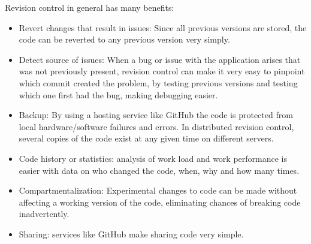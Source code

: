 Revision control in general has many benefits:
\begin{itemize}
  \item Revert changes that result in issues: Since all previous versions are stored, the code can be reverted to any previous version
  very simply.
  \item Detect source of issues: When a bug or issue with the application arises that was not previously present, revision control can
  make it very easy to pinpoint which commit created the problem, by testing previous versions and testing which one first had the bug,
  making debugging easier.
  \item Backup: By using a hosting service like GitHub the code is protected from local hardware/software failures and errors. In
  distributed revision control, several copies of the code exist at any given time on different servers.
  \item Code history or statistics: analysis of work load and work performance is easier with data on who changed the code, when, why
  and how many times.
  \item Compartmentalization: Experimental changes to code can be made without affecting a working version of the code, eliminating
  chances of breaking code inadvertently.
  \item Sharing: services like GitHub make sharing code very simple.
\end{itemize}
